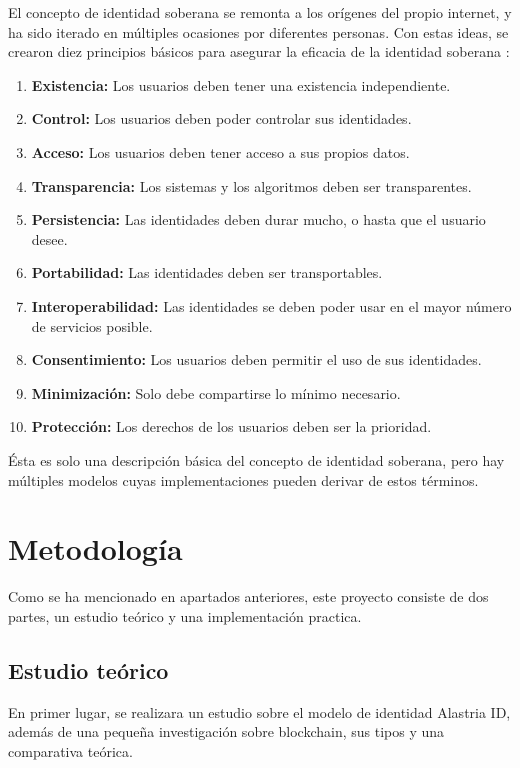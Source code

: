 El concepto de identidad soberana se remonta a los orígenes del propio internet, y ha sido iterado en múltiples ocasiones por diferentes personas. Con estas ideas, se crearon diez principios básicos para asegurar la eficacia de la identidad soberana \cite{path-to-ssi}:
\begin{enumerate}
    \item \textbf{Existencia:} Los usuarios deben tener una existencia independiente.
    \item \textbf{Control:} Los usuarios deben poder controlar sus identidades.
    \item \textbf{Acceso:} Los usuarios deben tener acceso a sus propios datos.
    \item \textbf{Transparencia:} Los sistemas y los algoritmos deben ser transparentes.
    \item \textbf{Persistencia:} Las identidades deben durar mucho, o hasta que el usuario desee.
    \item \textbf{Portabilidad:} Las identidades deben ser transportables.
    \item \textbf{Interoperabilidad:} Las identidades se deben poder usar en el mayor número de servicios posible.
    \item \textbf{Consentimiento:} Los usuarios deben permitir el uso de sus identidades.
    \item \textbf{Minimización:} Solo debe compartirse lo mínimo necesario.
    \item \textbf{Protección:} Los derechos de los usuarios deben ser la prioridad.
\end{enumerate}
Ésta es solo una descripción básica del concepto de identidad soberana, pero hay múltiples modelos cuyas implementaciones pueden derivar de estos términos.

\section{Metodología}
Como se ha mencionado en apartados anteriores, este proyecto consiste de dos partes, un estudio teórico y una implementación practica.

\subsection{Estudio teórico}
En primer lugar, se realizara un estudio sobre el modelo de identidad Alastria ID, además de una pequeña investigación sobre blockchain, sus tipos y una comparativa teórica.

